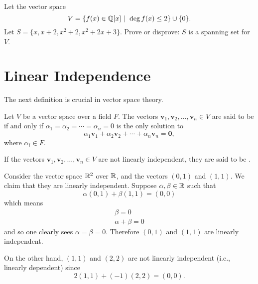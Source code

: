 \begin{exercise}
    Let the vector space
    \[
        V = \{f(x) \in \Q[x] \vert \deg f(x) \leq 2\} \cup \{0\}.
    \]
    Let $S = \{x, x + 2, x^2 + 2, x^2 + 2x + 3\}$. Prove or disprove: $S$ is a spanning set for $V$.
\end{exercise}

\section{Linear Independence}
The next definition is crucial in vector space theory.
\begin{definition}
    Let $V$ be a vector space over a field $F$. The vectors $\mathbf{v}_1, \mathbf{v}_2, \dots, \mathbf{v}_n \in V$ are said to be  if and only if $\alpha_1 = \alpha_2 = \cdots = \alpha_n = 0$ is the only solution to
    \[
        \alpha_1\mathbf{v}_1 + \alpha_2\mathbf{v}_2 + \cdots + \alpha_n\mathbf{v}_n = \mathbf{0},
    \]
    where $\alpha_i \in F$.

    If the vectors $\mathbf{v}_1, \mathbf{v}_2, \dots, \mathbf{v}_n \in V$ are not linearly independent, they are said to be .
\end{definition}

\begin{example}
    Consider the vector space $\mathbb{R}^2$ over $\mathbb{R}$, and the vectors $(0, 1)$ and $(1, 1)$. We claim that they are linearly independent. Suppose $\alpha, \beta \in \mathbb{R}$ such that
    \[
        \alpha(0, 1) + \beta(1, 1) = (0, 0)
    \]
    which means
    \begin{align*}
        \beta = 0\\
        \alpha + \beta = 0
    \end{align*}
    and so one clearly sees $\alpha = \beta = 0$. Therefore $(0, 1)$ and $(1, 1)$ are linearly independent.

    On the other hand, $(1, 1)$ and $(2, 2)$ are not linearly independent (i.e., linearly dependent) since
    \[
        2(1,1) + (-1)(2, 2) = (0, 0).
    \]
\end{example}

